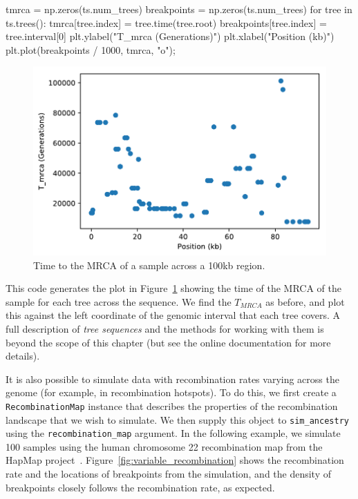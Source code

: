 \documentclass[graybox]{svmult}
\begin{document}
\begin{pythoncode}
tmrca = np.zeros(ts.num_trees)
breakpoints = np.zeros(ts.num_trees)
for tree in ts.trees():
    tmrca[tree.index] = tree.time(tree.root)
    breakpoints[tree.index] = tree.interval[0]
plt.ylabel("T_mrca (Generations)")
plt.xlabel("Position (kb)")
plt.plot(breakpoints / 1000, tmrca, "o");
\end{pythoncode}

\begin{figure}
\begin{center}
\includegraphics[width=\textwidth]{images/plot_10.pdf}
\end{center}
\caption{\label{fig:tree_tmrcas}Time to the MRCA of
a sample across a 100kb region.}
\end{figure}

This code generates the plot in Figure~\ref{fig:tree_tmrcas} showing the time of the MRCA of the sample for each tree across the
sequence. We find the \(T_{MRCA}\) as before, and plot this against the
left coordinate of the genomic interval that each tree covers. A full description of
\emph{tree sequences} and the methods for working with them is beyond the scope of this chapter (but see the online documentation for more details).

It is also possible to simulate data with recombination rates varying
across the genome (for example, in recombination hotspots). To do this, we
first create a \texttt{RecombinationMap} instance that describes the
properties of the recombination landscape that we wish to simulate. We
then supply this object to \texttt{sim\_ancestry} using the
\texttt{recombination\_map} argument. In the following example, we
simulate 100 samples using the human chromosome 22 recombination map
from the HapMap project~\citep{international2003international}.
Figure~\ref{fig:variable_recombination} shows the
recombination rate and the locations of breakpoints
from the simulation, and the density of breakpoints closely follows the
recombination rate, as expected.
\end{document}
